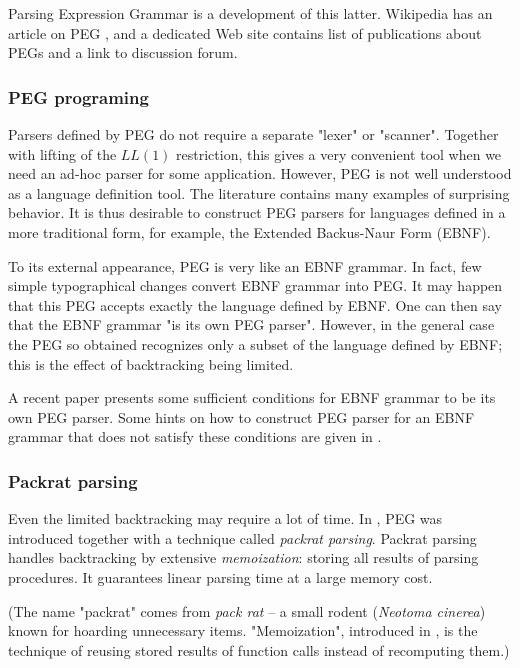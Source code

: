 Parsing Expression Grammar is a development of this latter.
%
Wikipedia has an article on PEG \cite{Wiki:PEG},
and a dedicated Web site \cite{PEG} contains 
list of publications about PEGs and a link to discussion forum.

\subsubsection*{PEG programing}

Parsers defined by PEG
do not require a separate "lexer" or "scanner".
Together with lifting of the $LL(1)$ restriction,
this gives a very convenient tool when we need 
an ad-hoc parser for some application.
%
However, PEG is not well understood as a language definition tool.
The literature contains many examples of surprising behavior.
It is thus desirable to construct PEG parsers for languages
defined in a more traditional form, for example, the Extended Backus-Naur Form (EBNF).

To its external appearance, PEG is very like an EBNF grammar.
In fact, few simple typographical changes convert EBNF grammar into PEG.
It may happen that this PEG accepts exactly the language defined by EBNF.
One can then say that the EBNF grammar "is its own PEG parser".
However, in the general case the
PEG so obtained recognizes only a subset of the language defined by EBNF;
this is the effect of backtracking being limited.

A recent paper \cite{Redz:2013:FI} presents
some sufficient conditions for EBNF grammar to be its own PEG parser.
Some hints on how to construct PEG parser for an EBNF grammar 
that does not satisfy these conditions 
are given in \cite{Medeiros:2014,Redz:2014:FI}.

\subsubsection*{Packrat parsing}

Even the limited backtracking may require a lot of time.
In \cite{Ford:2002,Ford:Thesis}, PEG was introduced together with
a technique called \emph{packrat parsing}.
Packrat parsing handles backtracking
by extensive \emph{memoization}: storing all results
of parsing procedures.
It guarantees linear parsing time at a large memory cost.

(The name "packrat" comes from \emph{pack rat} -- a small rodent (\emph{Neotoma cinerea})  
known for hoarding unnecessary items.
"Memoization", introduced in \cite{Michie:1968}, is the technique  
of reusing stored results of function calls instead of recomputing them.)

